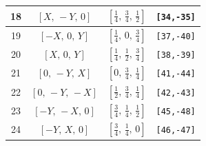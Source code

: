 \documentclass[fleqn,8pt]{jsarticle}
\begin{document}
\begin{longtable}{cccc}
18 & $\left[ X,\, - Y,\, 0 \right]$ & $\left[ \frac{1}{4},\, \frac{3}{4},\, \frac{1}{2} \right]$ & {\tt [34,-35]} \\ \hline
19 & $\left[ - X,\, 0,\, Y \right]$ & $\left[ \frac{1}{4},\, 0,\, \frac{3}{4} \right]$ & {\tt [37,-40]} \\ \hline
20 & $\left[ X,\, 0,\, Y \right]$ & $\left[ \frac{1}{4},\, \frac{1}{2},\, \frac{3}{4} \right]$ & {\tt [38,-39]} \\ \hline
21 & $\left[ 0,\, - Y,\, X \right]$ & $\left[ 0,\, \frac{3}{4},\, \frac{1}{4} \right]$ & {\tt [41,-44]} \\ \hline
22 & $\left[ 0,\, - Y,\, - X \right]$ & $\left[ \frac{1}{2},\, \frac{3}{4},\, \frac{1}{4} \right]$ & {\tt [42,-43]} \\ \hline
23 & $\left[ - Y,\, - X,\, 0 \right]$ & $\left[ \frac{3}{4},\, \frac{1}{4},\, \frac{1}{2} \right]$ & {\tt [45,-48]} \\ \hline
24 & $\left[ - Y,\, X,\, 0 \right]$ & $\left[ \frac{3}{4},\, \frac{1}{4},\, 0 \right]$ & {\tt [46,-47]} \\
\end{longtable}
\renewcommand{\arraystretch}{1.2}
\end{document}

